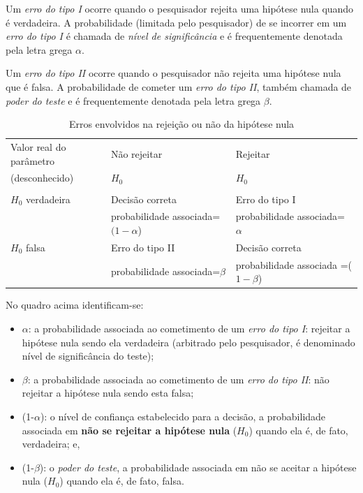 \documentclass[
]{book}
\providecommand{\tightlist}{%
  \setlength{\itemsep}{0pt}\setlength{\parskip}{0pt}}
\begin{document}
\hfill\break

Um \emph{erro do tipo I} ocorre quando o pesquisador rejeita uma hipótese nula quando é verdadeira. A probabilidade (limitada pelo pesquisador) de se incorrer em um \emph{erro do tipo I} é chamada de \emph{nível de significância} e é frequentemente denotada pela letra grega \(\alpha\).

\hfill\break

Um \emph{erro do tipo II} ocorre quando o pesquisador não rejeita uma hipótese nula que é falsa. A probabilidade de cometer um \emph{erro do tipo II}, também chamada de \emph{poder do teste} e é frequentemente denotada pela letra grega \(\beta\).

\hfill\break

\begin{table}[h]
\centering
\caption{{\small Erros envolvidos na rejeição ou não da hipótese nula}}
\begin{tabular}{p{5cm}p{5cm}p{5cm}}
\hline
\rowcolor{lightgray} Valor real do parâmetro & Não rejeitar & Rejeitar \\               
\rowcolor{lightgray} (desconhecido) & $H_{0}$ & $H_{0}$ \\
            \\[0.1cm]
\hline
        $H_{0}$ verdadeira & Decisão correta            & Erro do tipo I \\
                                     & probabilidade associada=$(1-\alpha$) & probabilidade associada= $\alpha$\\
\hline                           
        $H_{0}$ falsa      & Erro do tipo II            & Decisão correta \\
                                     & probabilidade associada=$\beta$    & probabilidade associada =($1-\beta$)  \\
\hline
\end{tabular}
\end{table} 

\hfill\break

No quadro acima identificam-se:

\hfill\break

\begin{itemize}
\tightlist
\item
  \(\alpha\): a probabilidade associada ao cometimento de um \emph{erro do tipo I}: rejeitar a hipótese nula sendo ela verdadeira (arbitrado pelo pesquisador, é denominado nível de significância do teste);
\item
  \(\beta\): a probabilidade associada ao cometimento de um \emph{erro do tipo II}: não rejeitar a hipótese nula sendo esta falsa;
\item
  (1-\(\alpha\)): o nível de confiança estabelecido para a decisão, a probabilidade associada em \textbf{não se rejeitar a hipótese nula} (\(H_{0}\)) quando ela é, de fato, verdadeira; e,
\item
  (1-\(\beta\)): o \emph{poder do teste}, a probabilidade associada em não se aceitar a hipótese nula (\(H_{0}\)) quando ela é, de fato, falsa.
\end{itemize}
\end{document}
